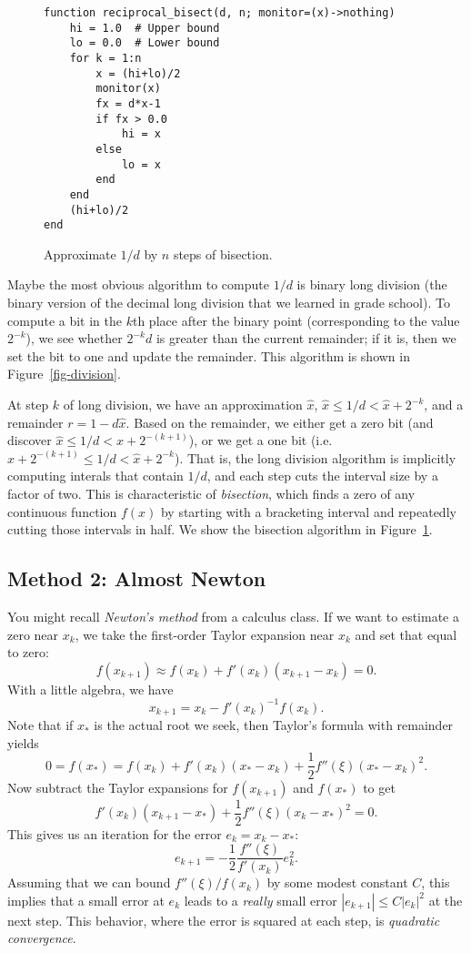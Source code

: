 \documentclass[12pt, leqno]{article} %
\begin{document}
\begin{figure}
\begin{lstlisting}
function reciprocal_bisect(d, n; monitor=(x)->nothing)
	hi = 1.0  # Upper bound
	lo = 0.0  # Lower bound
	for k = 1:n
		x = (hi+lo)/2
		monitor(x)
		fx = d*x-1
		if fx > 0.0
			hi = x
		else
			lo = x
		end
	end
	(hi+lo)/2
end
\end{lstlisting}
\caption{Approximate $1/d$ by $n$ steps of bisection.}
\label{fig-bisect}
\end{figure}

Maybe the most obvious algorithm to compute $1/d$ is binary long
division (the binary version of the decimal long division that
we learned in grade school).  To compute a bit in the $k$th place
after the binary point (corresponding to the value $2^{-k}$),
we see whether $2^{-k} d$ is greater than the current remainder;
if it is, then we set the bit to one and update the remainder.
This algorithm is shown in Figure~\ref{fig-division}.

At step $k$ of long division, we have an approximation $\hat{x}$,
$\hat{x} \leq 1/d < \hat{x}+2^{-k}$, and a remainder $r = 1-d
\hat{x}$.  Based on the remainder, we either get a zero bit (and
discover $\hat{x} \leq 1/d < \hat{x}+2^{-(k+1)}$), or we get a one bit
(i.e. $\hat{x}+2^{-(k+1)} \leq 1/d < \hat{x}+2^{-k}$).  That is,
the long division algorithm is implicitly computing interals that
contain $1/d$, and each step cuts the interval size by a factor of
two.  This is characteristic of {\em bisection}, which finds a zero
of any continuous function $f(x)$ by starting with a bracketing interval
and repeatedly cutting those intervals in half.  We show the
bisection algorithm in Figure~\ref{fig-bisect}.

\subsection*{Method 2: Almost Newton}

You might recall {\em Newton's method} from a calculus class.
If we want to estimate a zero near $x_k$, we take the first-order
Taylor expansion near $x_k$ and set that equal to zero:
\[
  f(x_{k+1}) \approx f(x_k) + f'(x_k)(x_{k+1}-x_k) = 0.
\]
With a little algebra, we have
\[
  x_{k+1} = x_k - f'(x_k)^{-1} f(x_k).
\]
Note that if $x_*$ is the actual root we seek, then
Taylor's formula with remainder yields
\[
  0 = f(x_*) = f(x_k) + f'(x_k)(x_*-x_k) + \frac{1}{2} f''(\xi) (x_*-x_k)^2.
\]
Now subtract the Taylor expansions for $f(x_{k+1})$ and $f(x_*)$ to get
\[
  f'(x_k)(x_{k+1}-x_*) + \frac{1}{2} f''(\xi) (x_k-x_*)^2 = 0.
\]
This gives us an iteration for the error $e_k = x_k-x_*$:
\[
  e_{k+1} = -\frac{1}{2} \frac{f''(\xi)}{f'(x_k)} e_k^2.
\]
Assuming that we can bound $f''(\xi)/f(x_k)$ by some modest constant $C$,
this implies that a small error at $e_k$ leads to a {\em really}
small error $|e_{k+1}| \leq C|e_k|^2$ at the next step.  This behavior,
where the error is squared at each step, is {\em quadratic convergence}.
\end{document}
